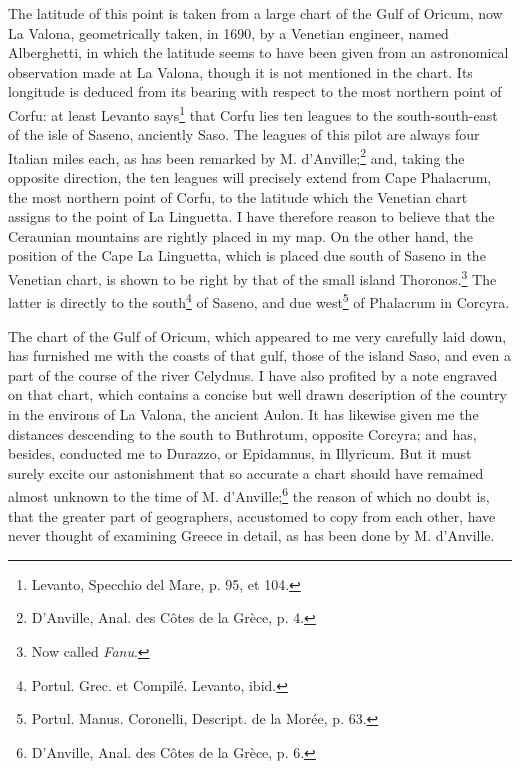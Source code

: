 \documentclass[a4paper, 11pt, oneside, polutonikogreek, english]{article}
\begin{document}
The latitude of this point is taken from a large chart of the Gulf of Oricum, now La Valona, geometrically taken, in 1690, by a Venetian engineer, named Alberghetti, in which the latitude seems to have been given from an astronomical observation made at La Valona, though it is not mentioned in the chart. Its longitude is deduced from its bearing with respect to the most northern point of Corfu: at least Levanto says\footnote{Levanto, Specchio del Mare, p. 95, et 104.} that Corfu lies ten leagues to the south-south-east of the isle of Saseno, anciently Saso. The leagues of this pilot are always four Italian miles each, as has been remarked by M. d'Anville;\footnote{D'Anville, Anal. des Côtes de la Grèce, p. 4.} and, taking the opposite direction, the ten leagues will precisely extend from Cape Phalacrum, the most northern point of Corfu, to the latitude which the Venetian chart assigns to the point of La Linguetta. I have therefore reason to believe that the Ceraunian mountains are rightly placed in my map. On the other hand, the position of the Cape La Linguetta, which is placed due south of Saseno in the Venetian chart, is shown to be right by that of the small island Thoronos.\footnote{Now called \emph{Fanu}.} The latter is directly to the south\footnote{Portul. Grec. et Compilé. Levanto, ibid.} of Saseno, and due west\footnote{Portul. Manus. Coronelli, Descript. de la Morée, p. 63.} of Phalacrum in Corcyra.

The chart of the Gulf of Oricum, which appeared to me very carefully laid down, has furnished me with the coasts of that gulf, those of the island Saso, and even a part of the course of the river Celydnus. I have also profited by a note engraved on that chart, which contains a concise but well drawn description of the country in the environs of La Valona, the ancient Aulon. It has likewise given me the distances descending to the south to Buthrotum, opposite Corcyra; and has, besides, conducted me to Durazzo, or Epidamnus, in Illyricum. But it must surely excite our astonishment that so accurate a chart should have remained almost unknown to the time of M. d'Anville;\footnote{D'Anville, Anal. des Côtes de la Grèce, p. 6.} the reason of which no doubt is, that the greater part of geographers, accustomed to copy from each other, have never thought of examining Greece in detail, as has been done by M. d'Anville.
\end{document}
